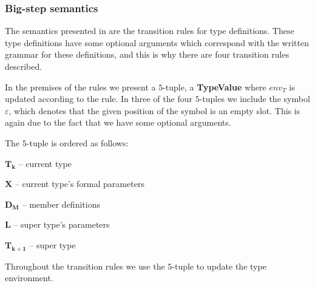 \subsubsection{Big-step semantics}

The semantics presented in  are the transition rules
for type definitions.  These type definitions have some optional arguments which
correspond with the written grammar for these definitions, and this is why there
are four transition rules described.



In the premises of the rules we present a $5$-tuple, a
\textbf{TypeValue} where $env_{T}$ is updated according to the rule. In
three of the four $5$-tuples we include the symbol $\varepsilon$, which
denotes that the given position of the symbol is an empty slot. This is
again due to the fact that we have some optional arguments.

The $5$-tuple is ordered as follows:

\begin{nlist}
\item $\mathbf{T_{k}}$ -- current type
  \item $\mathbf{X}$ -- current type's formal parameters
  \item $\mathbf{D_{M}}$ -- member definitions
  \item $\mathbf{L}$ -- super type's parameters
  \item $\mathbf{T_{k+1}}$ -- super type
\end{nlist}

Throughout the transition rules we use the $5$-tuple to update the type environment.
